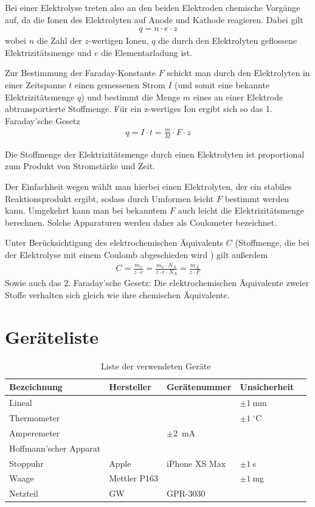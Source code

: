 \documentclass{article}
\begin{document}
Bei einer Elektrolyse treten also an den beiden Elektroden chemische Vorgänge auf, da die Ionen des Elektrolyten auf Anode und Kathode reagieren. Dabei gilt
\begin{align}
q = n\cdot e \cdot z
\end{align}
wobei $n$ die Zahl der $z$-wertigen Ionen, $q$ die durch den Elektrolyten geflossene Elektrizitätsmenge und $e$ die Elementarladung ist.

Zur Bestimmung der Faraday-Konstante $F$ schickt man durch den Elektrolyten in einer Zeitspanne $t$ einen gemessenen Strom $I$ (und somit eine bekannte Elektrizitätsmenge $q$) und bestimmt die Menge $m$ eines an einer Elektrode abtransportierte Stoffmenge. Für ein z-wertiges Ion ergibt sich so das 1. Faraday'sche Gesetz
\begin{align}
q = I\cdot t = \frac{m}{M} \cdot F \cdot z
\end{align}



Die Stoffmenge der Elektrizitätsmenge durch einen Elektrolyten ist proportional zum Produkt von Stromstärke und Zeit.

Der Einfachheit wegen wählt man hierbei einen Elektrolyten, der ein stabiles Reaktionsprodukt ergibt, sodass durch Umformen leicht $F$ bestimmt werden kann. Umgekehrt kann man bei bekanntem $F$ auch leicht die Elektrizitätsmenge berechnen. Solche Apparaturen werden daher als Coulometer bezeichnet.

Unter Berücksichtigung des elektrochemischen Äquivalents $C$ (Stoffmenge, die bei der Elektrolyse mit einem Coulomb abgeschieden wird \cite{chemie}) gilt außerdem
\begin{align}
C = \frac{m_x}{z\cdot e} = \frac{m_x\cdot N_A}{z\cdot e \cdot N_A} = \frac{m_A}{z\cdot F}
\end{align}
Sowie auch das 2. Faraday'sche Gesetz: Die elektrochemischen Äquivalente zweier Stoffe verhalten sich gleich wie ihre chemischen Äquivalente.





\section{Geräteliste}

\begin{table}[H]
\caption{Liste der verwendeten Geräte}

\begin{tabular}{l|llll}
Bezeichnung & Hersteller & Gerätenummer & Unsicherheit \\
\hline
Lineal & & & $\pm 1~$mm \\
Thermometer & & & $\pm 1~^\circ$C \\
Amperemeter & & $\pm 2$~mA \\
Hoffmann'scher Apparat  & & \\
Stoppuhr & Apple & iPhone XS Max & $\pm 1~$s \\
Waage & Mettler P163 &  & $\pm 1~$mg \\
Netzteil & GW & GPR-3030 & 
\end{tabular}

\end{table}
\end{document}
